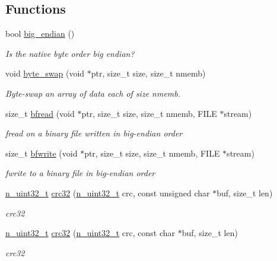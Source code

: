 \subsection*{Functions}
\begin{DoxyCompactItemize}
\item 
bool \mbox{\hyperlink{namespaceADATUtil_a7f9f0561f3ffcb562067ebedbade089f}{big\+\_\+endian}} ()
\begin{DoxyCompactList}\small\item\em Is the native byte order big endian? \end{DoxyCompactList}\item 
void \mbox{\hyperlink{namespaceADATUtil_af522573b90be52b1e09342dd11e23199}{byte\+\_\+swap}} (void $\ast$ptr, size\+\_\+t size, size\+\_\+t nmemb)
\begin{DoxyCompactList}\small\item\em Byte-\/swap an array of data each of size nmemb. \end{DoxyCompactList}\item 
size\+\_\+t \mbox{\hyperlink{namespaceADATUtil_af41a672c512fa9828e3ada70420985c9}{bfread}} (void $\ast$ptr, size\+\_\+t size, size\+\_\+t nmemb, F\+I\+LE $\ast$stream)
\begin{DoxyCompactList}\small\item\em fread on a binary file written in big-\/endian order \end{DoxyCompactList}\item 
size\+\_\+t \mbox{\hyperlink{namespaceADATUtil_afcbd366717135244eee5acb0d5ba86ac}{bfwrite}} (void $\ast$ptr, size\+\_\+t size, size\+\_\+t nmemb, F\+I\+LE $\ast$stream)
\begin{DoxyCompactList}\small\item\em fwrite to a binary file in big-\/endian order \end{DoxyCompactList}\item 
\mbox{\hyperlink{namespaceADATUtil_ad945a8afa4db2d1f89b731964adae97e}{n\+\_\+uint32\+\_\+t}} \mbox{\hyperlink{namespaceADATUtil_a61372c5ac63a8bd3ce0aec8f04f386d9}{crc32}} (\mbox{\hyperlink{namespaceADATUtil_ad945a8afa4db2d1f89b731964adae97e}{n\+\_\+uint32\+\_\+t}} crc, const unsigned char $\ast$buf, size\+\_\+t len)
\begin{DoxyCompactList}\small\item\em crc32 \end{DoxyCompactList}\item 
\mbox{\hyperlink{namespaceADATUtil_ad945a8afa4db2d1f89b731964adae97e}{n\+\_\+uint32\+\_\+t}} \mbox{\hyperlink{namespaceADATUtil_aea7a30b468249f17899ebbb9902fb330}{crc32}} (\mbox{\hyperlink{namespaceADATUtil_ad945a8afa4db2d1f89b731964adae97e}{n\+\_\+uint32\+\_\+t}} crc, const char $\ast$buf, size\+\_\+t len)
\begin{DoxyCompactList}\small\item\em crc32 \end{DoxyCompactList}\end{DoxyCompactItemize}
